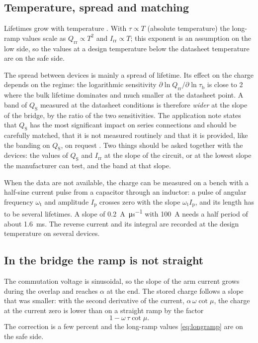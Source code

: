 \documentclass[10pt,a4paper]{scrartcl}
\newcommand{\Qrr}{Q_\mathrm{rr}}
\newcommand{\Irr}{I_\mathrm{rr}}
\newcommand{\taub}{\tau_\mathrm{b}}
\begin{document}
\subsection{Temperature, spread and matching}
Lifetimes grow with temperature \cite{lutz}. With $\tau \propto T$ (absolute temperature) the long-ramp values scale as $\Qrr \propto T^2$ and $\Irr \propto T$; this exponent is an assumption on the low side, so the values at a design temperature below the datasheet temperature are on the safe side.

The spread between devices is mainly a spread of lifetime. Its effect on the charge depends on the regime: the logarithmic sensitivity $\partial\ln\Qrr/\partial\ln\taub$ is close to 2 where the bulk lifetime dominates and much smaller at the datasheet point. A band of $Q_\mathrm{S}$ measured at the datasheet conditions is therefore \emph{wider} at the slope of the bridge, by the ratio of the two sensitivities. The application note states that $Q_\mathrm{S}$ has the most significant impact on series connections and should be carefully matched, that it is not measured routinely and that it is provided, like the banding on $Q_\mathrm{S}$, on request \cite[Sec.~2.2.3]{an6531}. Two things should be asked together with the devices: the values of $Q_\mathrm{S}$ and $\Irr$ at the slope of the circuit, or at the lowest slope the manufacturer can test, and the band at that slope.

When the data are not available, the charge can be measured on a bench with a half-sine current pulse from a capacitor through an inductor: a pulse of angular frequency $\omega_\mathrm{t}$ and amplitude $I_\mathrm{p}$ crosses zero with the slope $\omega_\mathrm{t} I_\mathrm{p}$, and its length has to be several lifetimes. A slope of \SI{0.2}{\ampere\per\micro\second} with \SI{100}{\ampere} needs a half period of about \SI{1.6}{\milli\second}. The reverse current and its integral are recorded at the design temperature on several devices.

\subsection{In the bridge the ramp is not straight}
The commutation voltage is sinusoidal, so the slope of the arm current grows during the overlap and reaches $\alpha$ at the end. The stored charge follows a slope that was smaller: with the second derivative of the current, $\alpha\,\omega\cot\mu$, the charge at the current zero is lower than on a straight ramp by the factor
\begin{equation}
1 - \omega\,\tau\cot\mu .
\label{eq:rampcorr}
\end{equation}
The correction is a few percent and the long-ramp values \eqref{eq:longramp} are on the safe side.
\end{document}
